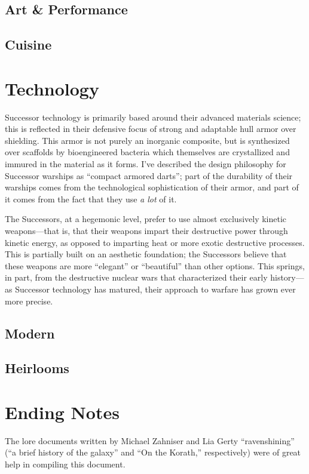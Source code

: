 \documentclass[11pt]{report}
\begin{document}
    \subsection{Art \& Performance}
    \subsection{Cuisine}
    \section{Technology}
    Successor technology is primarily based around their advanced materials science; this is reflected in their defensive focus of strong and adaptable hull armor over shielding. This armor is not purely an inorganic composite, but is synthesized over scaffolds by bioengineered bacteria which themselves are crystallized and immured in the material as it forms. I've described the design philosophy for Successor warships as ``compact armored darts''; part of the durability of their warships comes from the technological sophistication of their armor, and part of it comes from the fact that they use \emph{a lot} of it.

    The Successors, at a hegemonic level, prefer to use almost exclusively kinetic weapons---that is, that their weapons impart their destructive power through kinetic energy, as opposed to imparting heat or more exotic destructive processes. This is partially built on an aesthetic foundation; the Successors believe that these weapons are more ``elegant'' or ``beautiful'' than other options. This springs, in part, from the destructive nuclear wars that characterized their early history---as Successor technology has matured, their approach to warfare has grown ever more precise.

    \subsection{Modern}
    \subsection{Heirlooms}
    \section{Ending Notes}
    The lore documents written by Michael Zahniser and Lia Gerty ``ravenshining'' (``a brief history of the galaxy'' and ``On the Korath,'' respectively) were of great help in compiling this document.
\end{document}
